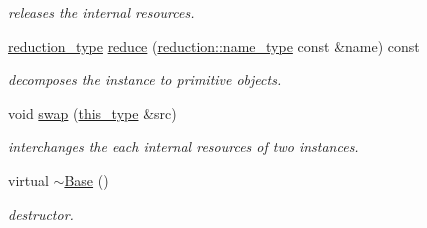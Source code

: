 \begin{DoxyCompactItemize}
\begin{DoxyCompactList}\small\item\em releases the internal resources. \end{DoxyCompactList}\item 
\hypertarget{classhryky_1_1http_1_1header_1_1comment_1_1_base_a2809ad5f75abd2266e6804e90094bc05}{\hyperlink{namespacehryky_a343a9a4c36a586be5c2693156200eadc}{reduction\-\_\-type} \hyperlink{classhryky_1_1http_1_1header_1_1comment_1_1_base_a2809ad5f75abd2266e6804e90094bc05}{reduce} (\hyperlink{namespacehryky_1_1reduction_ac686c30a4c8d196bbd0f05629a6b921f}{reduction\-::name\-\_\-type} const \&name) const }\label{classhryky_1_1http_1_1header_1_1comment_1_1_base_a2809ad5f75abd2266e6804e90094bc05}

\begin{DoxyCompactList}\small\item\em decomposes the instance to primitive objects. \end{DoxyCompactList}\item 
\hypertarget{classhryky_1_1http_1_1header_1_1comment_1_1_base_ab2b137d16fbe40d839ee136bd5304cab}{void \hyperlink{classhryky_1_1http_1_1header_1_1comment_1_1_base_ab2b137d16fbe40d839ee136bd5304cab}{swap} (\hyperlink{classhryky_1_1http_1_1header_1_1comment_1_1_base_aaf640b42927f7c8c53ee91e0e13422ca}{this\-\_\-type} \&src)}\label{classhryky_1_1http_1_1header_1_1comment_1_1_base_ab2b137d16fbe40d839ee136bd5304cab}

\begin{DoxyCompactList}\small\item\em interchanges the each internal resources of two instances. \end{DoxyCompactList}\item 
\hypertarget{classhryky_1_1http_1_1header_1_1comment_1_1_base_a722da881b6c70cfcbde9243abcfbf334}{virtual \hyperlink{classhryky_1_1http_1_1header_1_1comment_1_1_base_a722da881b6c70cfcbde9243abcfbf334}{$\sim$\-Base} ()}\label{classhryky_1_1http_1_1header_1_1comment_1_1_base_a722da881b6c70cfcbde9243abcfbf334}

\begin{DoxyCompactList}\small\item\em destructor. \end{DoxyCompactList}\end{DoxyCompactItemize}
